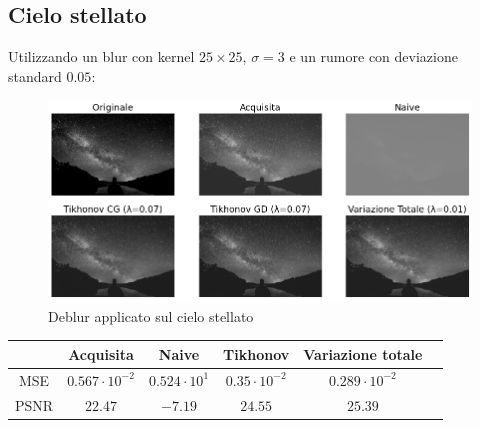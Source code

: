 \documentclass[11pt]{article}
\begin{document}
\subsection{Cielo stellato}
Utilizzando un blur con kernel $25 \times 25$, $\sigma=3$ e un rumore con deviazione standard $0.05$:
\begin{figure}[H]
    \centering
    \includegraphics[width=15cm]{reale/2/deblur.png}
    \caption{Deblur applicato sul cielo stellato}
    \label{fig:deblur_reale2}
\end{figure}
\begin{center}
    \begin{tabular}{ |c|c|c|c|c|c| }
    \hline
    & Acquisita & Naive & Tikhonov & Variazione totale \\ 
    \hline
    MSE & $0.567 \cdot 10^{-2}$ & $0.524 \cdot 10^{1}$ & $0.35 \cdot 10^{-2}$ & $0.289 \cdot 10^{-2}$ \\ 
    PSNR & $22.47$ & $-7.19$ & $24.55$ & $25.39$ \\ 
    \hline
    \end{tabular}
\end{center}
\end{document}
